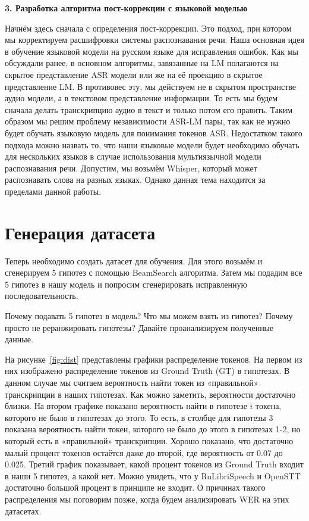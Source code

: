\newpage
\begin{center}
  \textbf{\large 3. Разработка алгоритма пост-коррекции с языковой моделью}
\end{center}

Начнём здесь сначала с определения пост-коррекции.
Это подход, при котором мы корректируем расшифровки системы распознавания речи.
Наша основная идея в обучение языковой модели на русском языке для исправления ошибок.
Как мы обсуждали ранее, в основном алгоритмы, завязанные на LM полагаются на скрытое представление ASR модели или же на её проекцию в скрытое представление LM.
В противовес эту, мы действуем не в скрытом пространстве аудио модели, а в текстовом представление информации.
То есть мы будем сначала делать транскрипцию аудио в текст и только потом его править.
Таким образом мы решим проблему независимости ASR-LM пары, так как не нужно будет обучать языковую модель для понимания токенов ASR.
Недостатком такого подхода можно назвать то, что наши языковые модели будет необходимо обучать для нескольких языков в случае использования мультиязычной модели распознавания речи.
Допустим, мы возьмём Whisper, который может распознавать слова на разных языках.
Однако данная тема находится за пределами данной работы.

\section{Генерация датасета}
Теперь необходимо создать датасет для обучения.
Для этого возьмём и сгенерируем 5 гипотез с помощью BeamSearch алгоритма\cite{chen2023hyporadise}.
Затем мы подадим все 5 гипотез в нашу модель и попросим сгенерировать исправленную последовательность.

Почему подавать 5 гипотез в модель? Что мы можем взять из гипотез?
Почему просто не реранжировать гипотезы?
Давайте проанализируем полученные данные.

На рисунке~\ref{fig:dist} представлены графики распределение токенов.
На первом из них изображено распределение токенов из Ground Truth (GT) в гипотезах.
В данном случае мы считаем вероятность найти токен из «правильной» транскрипции в наших гипотезах.
Как можно заметить, вероятности достаточно близки.
На втором графике показано вероятность найти в гипотезе $i$ токена, которого не было в гипотезах до этого.
То есть, в столбце для гипотезы 3 показана вероятность найти токен, которого не было до этого в гипотезах 1-2, но который есть в «правильной» транскрипции.
Хорошо показано, что достаточно малый процент токенов остаётся даже до второй, где вероятность от 0.07 до 0.025.
Третий график показывает, какой процент токенов из Ground Truth входит в наши 5 гипотез, а какой нет.
Можно увидеть, что у RuLibriSpeech и OpenSTT достаточно большой процент в принципе не входит.
О причинах такого распределения мы поговорим позже, когда будем анализировать WER на этих датасетах.

